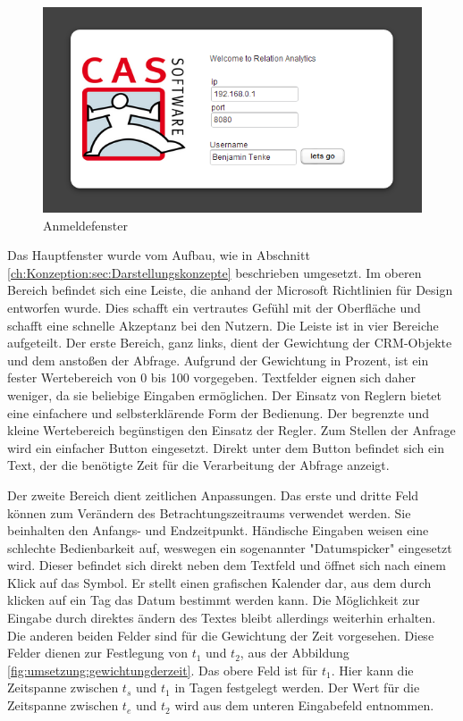 \begin{figure}[htbp]
\centering
\includegraphics[scale=2.0]{pics/login.png}
\caption{Anmeldefenster}
\label{ergebniss_oberflaeche_anmeld}
\end{figure}

Das Hauptfenster wurde vom Aufbau, wie in Abschnitt \ref{ch:Konzeption:sec:Darstellungskonzepte} beschrieben umgesetzt. Im oberen Bereich befindet sich eine Leiste, die anhand der Microsoft Richtlinien für Design entworfen wurde. Dies schafft ein vertrautes Gefühl mit der Oberfläche und schafft eine schnelle Akzeptanz bei den Nutzern. Die Leiste ist in vier Bereiche aufgeteilt. Der erste Bereich, ganz links, dient der Gewichtung der CRM-Objekte und dem anstoßen der Abfrage. Aufgrund der Gewichtung in Prozent, ist ein fester Wertebereich von 0 bis 100 vorgegeben. Textfelder eignen sich daher weniger, da sie beliebige Eingaben ermöglichen. Der Einsatz von Reglern bietet eine einfachere und selbsterklärende Form der Bedienung. Der begrenzte und kleine Wertebereich begünstigen den Einsatz der Regler. Zum Stellen der Anfrage wird ein einfacher Button eingesetzt. Direkt unter dem Button befindet sich ein Text, der die benötigte Zeit für die Verarbeitung der Abfrage anzeigt. 

Der zweite Bereich dient zeitlichen Anpassungen. Das erste und dritte Feld können zum Verändern des Betrachtungszeitraums verwendet werden. Sie beinhalten den Anfangs- und Endzeitpunkt. Händische Eingaben weisen eine schlechte Bedienbarkeit auf, weswegen ein sogenannter "Datumspicker" eingesetzt wird. Dieser befindet sich direkt neben dem Textfeld und öffnet sich nach einem Klick auf das Symbol. Er stellt einen grafischen Kalender dar, aus dem durch klicken auf ein Tag das Datum bestimmt werden kann. Die Möglichkeit zur Eingabe durch direktes ändern des Textes bleibt allerdings weiterhin erhalten. Die anderen beiden Felder sind für die Gewichtung der Zeit vorgesehen. Diese Felder dienen zur Festlegung von $t_1$ und $t_2$, aus der Abbildung \ref{fig:umsetzung:gewichtungderzeit}. Das obere Feld ist für $t_1$. Hier kann die Zeitspanne zwischen $t_{s}$ und $t_1$ in Tagen festgelegt werden. Der Wert für die Zeitspanne zwischen $t_{e}$ und $t_2$ wird aus dem unteren Eingabefeld entnommen.

